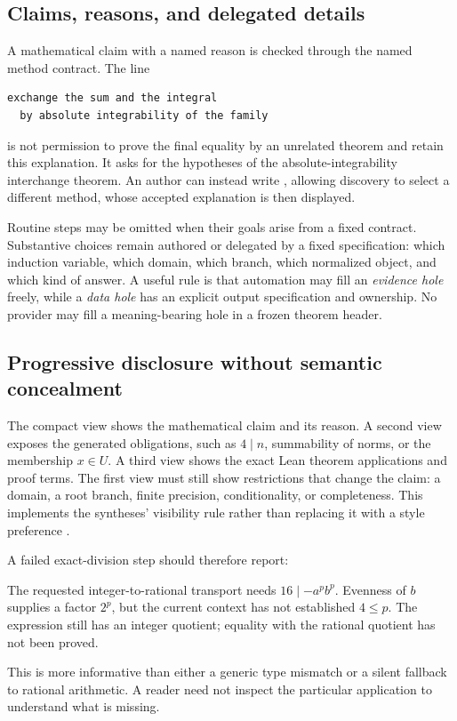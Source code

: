 \documentclass[11pt,a4paper]{article}
\newcommand{\code}[1]{\texttt{\detokenize{#1}}}
\theoremstyle{plain}\newtheorem{proposition}{Proposition}[section]
\theoremstyle{definition}\newtheorem{definition}[proposition]{Definition}
\theoremstyle{remark}\newtheorem{remark}[proposition]{Remark}
\begin{document}
\subsection{Claims, reasons, and delegated details}
A mathematical claim with a named reason is checked through the named method contract. The line
\begin{lstlisting}
exchange the sum and the integral
  by absolute integrability of the family
\end{lstlisting}
is not permission to prove the final equality by an unrelated theorem and retain this explanation. It asks for the hypotheses of the absolute-integrability interchange theorem. An author can instead write \code{search for a proof}, allowing discovery to select a different method, whose accepted explanation is then displayed.

Routine steps may be omitted when their goals arise from a fixed contract. Substantive choices remain authored or delegated by a fixed specification: which induction variable, which domain, which branch, which normalized object, and which kind of answer. A useful rule is that automation may fill an \emph{evidence hole} freely, while a \emph{data hole} has an explicit output specification and ownership. No provider may fill a meaning-bearing hole in a frozen theorem header.

\subsection{Progressive disclosure without semantic concealment}
The compact view shows the mathematical claim and its reason. A second view exposes the generated obligations, such as \(4\mid n\), summability of norms, or the membership \(x\in U\). A third view shows the exact Lean theorem applications and proof terms. The first view must still show restrictions that change the claim: a domain, a root branch, finite precision, conditionality, or completeness. This implements the syntheses' visibility rule rather than replacing it with a style preference \cite{synA}.

A failed exact-division step should therefore report:
\begin{claimbox}
The requested integer-to-rational transport needs \(16\mid -a^p b^p\). Evenness of \(b\) supplies a factor \(2^p\), but the current context has not established \(4\le p\). The expression still has an integer quotient; equality with the rational quotient has not been proved.
\end{claimbox}
This is more informative than either a generic type mismatch or a silent fallback to rational arithmetic. A reader need not inspect the particular \code{Rat.intCast_div} application to understand what is missing.
\end{document}

